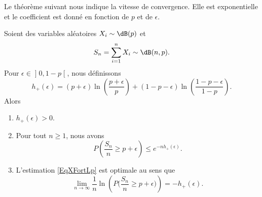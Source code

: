 Le théorème suivant nous indique la vitesse de convergence. Elle est exponentielle et le coefficient est donné en fonction de \( p\) et de \( \epsilon\).

\begin{theorem} \label{ThoYYaBXkU}
    Soient des variables aléatoires \( X_i\sim\dB(p)\) et
    \begin{equation}
        S_n=\sum_{i=1}^nX_i\sim\dB(n,p).
    \end{equation}
    Pour \( \epsilon\in\mathopen] 0 , 1-p \mathclose[\), nous définissons
    \begin{equation}
        h_+(\epsilon)=(p+\epsilon)\ln\left( \frac{ p+\epsilon }{ p } \right)+(1-p-\epsilon)\ln\left( \frac{ 1-p-\epsilon }{ 1-p } \right).
    \end{equation}
    Alors
    \begin{enumerate}
        \item\label{ItemUWyKcpMi}
            \( h_+(\epsilon)>0\).
        \item\label{ItemUWyKcpMii}
            Pour tout \( n\geq 1\), nous avons
            \begin{equation}    \label{EqXFortLp}
                P\left( \frac{ S_n }{ n }\geq p+\epsilon \right)\leq  e^{-nh_+(\epsilon)}.
            \end{equation}
        \item\label{ItemUWyKcpMiii}
            L'estimation \eqref{EqXFortLp} est optimale au sens que
            \begin{equation}
                \lim_{n\to \infty} \frac{1}{ n }\ln\left( P\big( \frac{ S_n }{ n } \geq p+\epsilon \big) \right)=-h_+(\epsilon).
            \end{equation}
    \end{enumerate}
\end{theorem}

